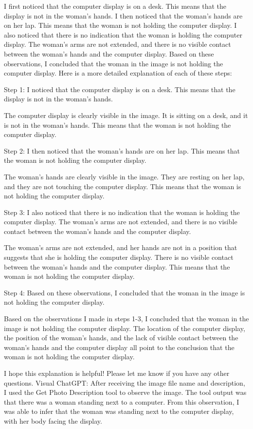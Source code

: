 \begin{enumerate}
        I first noticed that the computer display is on a desk. This means that the display is not in the woman's hands.
        I then noticed that the woman's hands are on her lap. This means that the woman is not holding the computer display.
        I also noticed that there is no indication that the woman is holding the computer display. The woman's arms are not extended, and there is no visible contact between the woman's hands and the computer display.
        Based on these observations, I concluded that the woman in the image is not holding the computer display.
        Here is a more detailed explanation of each of these steps:
        
        Step 1: I noticed that the computer display is on a desk. This means that the display is not in the woman's hands.
        
        The computer display is clearly visible in the image. It is sitting on a desk, and it is not in the woman's hands. This means that the woman is not holding the computer display.
        
        Step 2: I then noticed that the woman's hands are on her lap. This means that the woman is not holding the computer display.
        
        The woman's hands are clearly visible in the image. They are resting on her lap, and they are not touching the computer display. This means that the woman is not holding the computer display.
        
        Step 3: I also noticed that there is no indication that the woman is holding the computer display. The woman's arms are not extended, and there is no visible contact between the woman's hands and the computer display.
        
        The woman's arms are not extended, and her hands are not in a position that suggests that she is holding the computer display. There is no visible contact between the woman's hands and the computer display. This means that the woman is not holding the computer display.
        
        Step 4: Based on these observations, I concluded that the woman in the image is not holding the computer display.
        
        Based on the observations I made in steps 1-3, I concluded that the woman in the image is not holding the computer display. The location of the computer display, the position of the woman's hands, and the lack of visible contact between the woman's hands and the computer display all point to the conclusion that the woman is not holding the computer display.
        
        I hope this explanation is helpful! Please let me know if you have any other questions.
        \subitem Visual ChatGPT: After receiving the image file name and description, I used the Get Photo Description tool to observe the image. The tool output was that there was a woman standing next to a computer. From this observation, I was able to infer that the woman was standing next to the computer display, with her body facing the display.
    \end{enumerate}